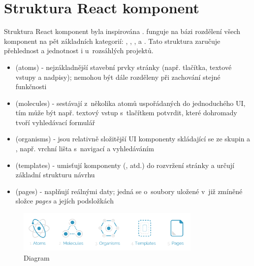 \documentclass[12pt, a4paper,
  oneside,      %
]{report}
\newenvironment{propertiesItemize}{
\begin{itemize}{ 
  }}
  {\end{itemize}}
\begin{document}
\section{Struktura React komponent}\label{subsubsection:reactComponents}
Struktura React komponent byla inspirována .  funguje na bázi rozdělení všech komponent na pět základních kategorií: , , ,  a . Tato struktura zaručuje přehlednost a jednotnost i u~rozsáhlých projektů. \cite{reactComponentsAtomicDesign}
\begin{propertiesItemize}
	\item \textbf{} (atoms) - nejzákladnější stavební prvky stránky (např. tlačítka, textové vstupy a nadpisy); nemohou být dále rozděleny při zachování stejné funkčnosti \cite{reactComponentsAtomicDesign}
	\item \textbf{} (molecules) - sestávají z~několika atomů uspořádaných do jednoduchého UI, tím může být např. textový vstup s~tlačítkem potvrdit, které dohromady tvoří vyhledávací formulář \cite{reactComponentsAtomicDesign}
	\item \textbf{} (organisms) - jsou relativně složitější UI komponenty skládající se ze skupin  a , např. vrchní lišta s~navigací a vyhledáváním \cite{reactComponentsAtomicDesign}
	\item \textbf{} (templates) - umisťují komponenty (, atd.) do rozvržení stránky a určují základní strukturu návrhu \cite{reactComponentsAtomicDesign}
	\item \textbf{} (pages) - naplňují  reálnými daty; jedná se o~soubory uložené v~již zmíněné složce \textit{pages} a jejích podsložkách \cite{reactComponentsAtomicDesign}
\end{propertiesItemize}
\begin{figure}[h]
	\centering
	\includegraphics[width=0.8\textwidth]{images/react_atomic_design.png}
	\caption{Diagram  \cite{reactComponentsAtomicDesignDiagram}}
\end{figure}
\end{document}
